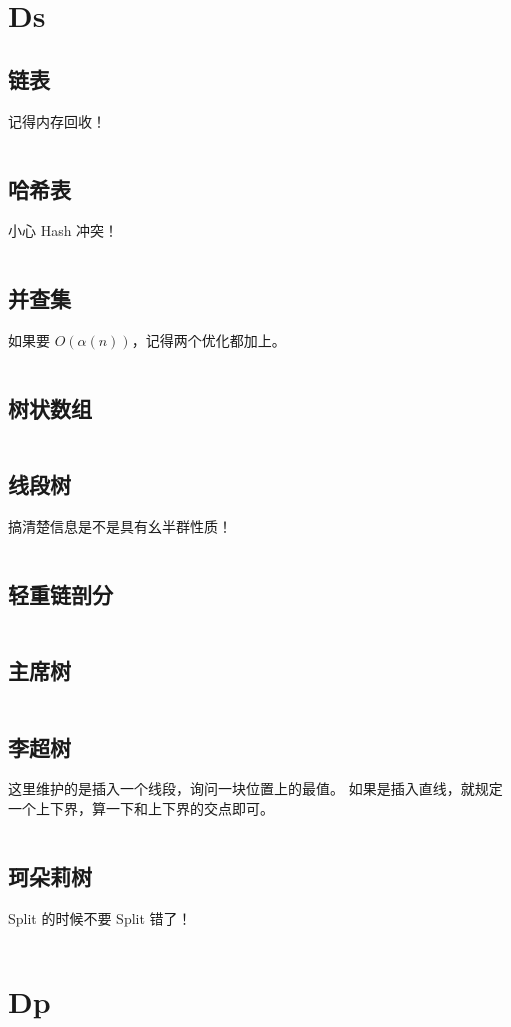 \documentclass[titlepage, a4paper]{article}
\begin{document}
\begin{multicols}{2}
\begin{spacing}{0.6}
			 \section{Ds}
			 	\subsection{链表}
			 		记得内存回收！
			 		\inputminted{cpp}{src/Ds/List.cpp}
			 	\subsection{哈希表}
			 		小心 Hash 冲突！
			 		\inputminted{cpp}{src/Ds/Hash_table.cpp}
			 	\subsection{并查集}
			 		如果要 $O(\alpha(n))$，记得两个优化都加上。
			 		\inputminted{cpp}{src/Ds/Dsu.cpp}
			 	\subsection{树状数组}
			 		\inputminted{cpp}{src/Ds/Fenwick_tree.cpp}
			 	\subsection{线段树}
			 		搞清楚信息是不是具有幺半群性质！
			 		\inputminted{cpp}{src/Ds/Segment_tree.cpp}
			 	\subsection{轻重链剖分}
			 		\inputminted{cpp}{src/Ds/Hld.cpp}
			 	\subsection{主席树}
			 		\inputminted{cpp}{src/Ds/Persistent_seg.cpp}
			 	\subsection{李超树}
			 		这里维护的是插入一个线段，询问一块位置上的最值。
			 		如果是插入直线，就规定一个上下界，算一下和上下界的交点即可。
			 		\inputminted{cpp}{src/Ds/Li_chao_tree.cpp}
			 	\subsection{珂朵莉树}
			 		Split 的时候不要 Split 错了！
			 		\inputminted{cpp}{src/Ds/Odt.cpp}
			 \section{Dp}

\end{spacing}
\end{multicols}
\end{document}
